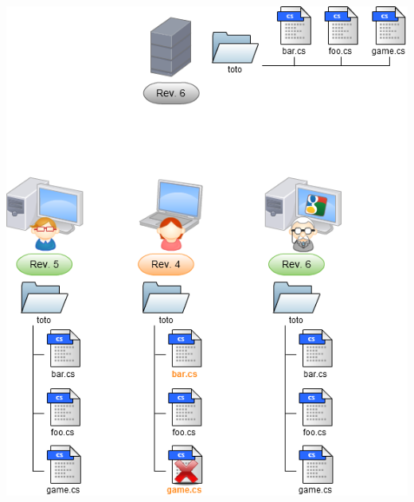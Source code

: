 \begin{frame}
  \begin{center}
    \includegraphics[scale=0.3]{images/7-Work.png}
  \end{center}
\end{frame}

